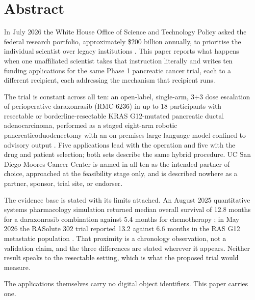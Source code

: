 \section*{Abstract}

In July 2026 the White House Office of Science and Technology Policy asked the
federal research portfolio, approximately \$200 billion annually, to prioritise
the individual scientist over legacy institutions
\cite{kratsios2026sciencegoldenage}. This paper reports what happens when one
unaffiliated scientist takes that instruction literally and writes ten funding
applications for the same Phase 1 pancreatic cancer trial, each to a different
recipient, each addressing the mechanism that recipient runs.

The trial is constant across all ten: an open-label, single-arm, 3+3 dose
escalation of perioperative daraxonrasib (RMC-6236) in up to 18 participants
with resectable or borderline-resectable KRAS G12-mutated pancreatic ductal
adenocarcinoma, performed as a staged eight-arm robotic pancreaticoduodenectomy
with an on-premises large language model confined to advisory output
\cite{onpremwhippl,phase1ind}. Five applications lead with the operation and
five with the drug and patient selection; both sets describe the same hybrid
procedure. UC San Diego Moores Cancer Center is named in all ten as the intended
partner of choice, approached at the feasibility stage only, and is described
nowhere as a partner, sponsor, trial site, or endorser.

The evidence base is stated with its limits attached. An August 2025 quantitative
systems pharmacology simulation returned median overall survival of 12.8 months
for a daraxonrasib combination against 5.4 months for chemotherapy
\cite{qspmetpancre}; in May 2026 the RASolute 302 trial reported 13.2 against
6.6 months in the RAS G12 metastatic population \cite{rasolute302}. That
proximity is a chronology observation, not a validation claim, and the three
differences are stated wherever it appears. Neither result speaks to the
resectable setting, which is what the proposed trial would measure.

The applications themselves carry no digital object identifiers. This paper
carries one.


